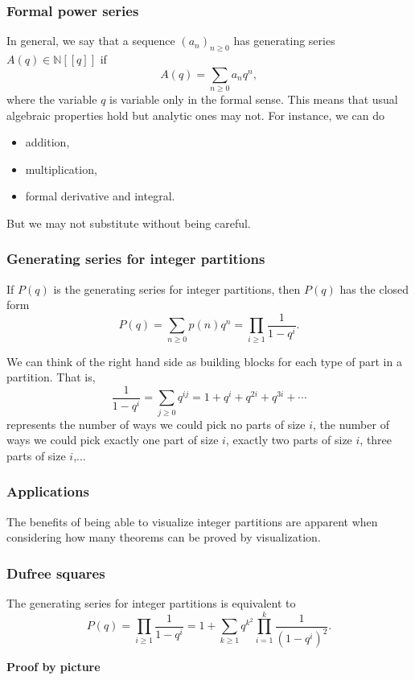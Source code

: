 \documentclass{beamer}
\def\nats{{\mathbb N}}
\begin{document}
\begin{frame}
\frametitle{Formal power series}
In general, we say that a sequence $(a_n)_{n\geq 0}$ has generating series $A(q)\in \nats[[q]]$ if $$A(q) = \sum_{n\geq 0}a_nq^n,$$
\pause where the variable $q$ is variable only in the formal sense. This means that usual algebraic properties hold but analytic ones may not. For instance, we can do \pause
\begin{itemize}
  \item addition,
  \item multiplication, \pause
  \item formal derivative and integral.
\end{itemize}

But we may not substitute without being careful.

\end{frame}


\begin{frame}
\frametitle{Generating series for integer partitions}

If $P(q)$ is the generating series for integer partitions, then $P(q)$ has the closed form
$$P(q) = \sum_{n\geq0}p(n)q^n = \prod_{i\geq 1}\frac{1}{1-q^i}.$$

\pause 
We can think of the right hand side as building blocks for each type of part in a partition. \pause That is,
$$\frac{1}{1-q^i} = \sum_{j \geq 0}q^{ij} = 1 + q^i + q^{2i} +q^{3i} +\dotsb $$
represents the number of ways we could pick no parts of size $i$, the number of ways we could pick exactly one part of size $i$, exactly two parts of size $i$, three parts of size $i$,$\ldots$
\end{frame}

\begin{frame}
  \frametitle{Applications}
  The benefits of being able to visualize integer partitions are apparent when considering how many theorems can be proved by visualization.
\end{frame}

\begin{frame}
	\frametitle{Dufree squares}
\begin{theorem}
The generating series for integer partitions is equivalent to
$$P(q) = \prod_{i\geq 1} \frac{1}{1-q^i} = 1 + \sum_{k\geq1}q^{k^2}\prod_{i=1}^{k}\frac{1}{(1-q^i)^2}.$$	
\end{theorem}
\pause
\textbf{Proof by picture}
\begin{center}
\end{center}
\end{frame}
\end{document}

